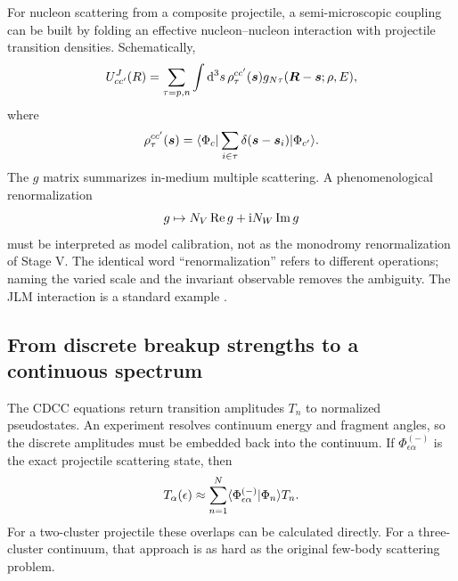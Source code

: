 For nucleon scattering from a composite projectile, a semi-microscopic
coupling can be built by folding an effective nucleon--nucleon interaction
with projectile transition densities.  Schematically,
\begin{equation}
  U^J_{cc'}(R)
  =\sum_{\tau=p,n}
   \int\mathrm{d}^3s\,
   \rho^{cc'}_\tau(\bm s)
   g_{N\tau}(\bm R-\bm s;\rho,E),
  \label{eq:single-folding-coupling}
\end{equation}
where
\begin{equation}
  \rho^{cc'}_\tau(\bm s)
  =\langle \Phi_c \rvert
  \sum_{i\in\tau}\delta(\bm s-\bm s_i)
  \lvert \Phi_{c'} \rangle.
  \label{eq:transition-density}
\end{equation}
The $g$ matrix summarizes in-medium multiple scattering.  A phenomenological
renormalization
\begin{equation}
  g\mapsto N_V\operatorname{Re} g+\mathrm{i} N_W\operatorname{Im} g
  \label{eq:jlm-renormalization}
\end{equation}
must be interpreted as model calibration, not as the monodromy renormalization
of Stage V.  The identical word ``renormalization'' refers to different
operations; naming the varied scale and the invariant observable removes the
ambiguity.  The JLM interaction is a standard example
\cite{Jeukenne1977JLM}.

\subsection{From discrete breakup strengths to a continuous spectrum}
\label{subsec:cdcc-smoothing}

The CDCC equations return transition amplitudes $T_n$ to normalized
pseudostates.  An experiment resolves continuum energy and fragment angles,
so the discrete amplitudes must be embedded back into the continuum.  If
$\Phi_{\epsilon\alpha}^{(-)}$ is the exact projectile scattering state, then
\begin{equation}
  T_\alpha(\epsilon)
  \approx\sum_{n=1}^{N}
  \langle \Phi_{\epsilon\alpha}^{(-)}|\Phi_n \rangle T_n.
  \label{eq:cdcc-exact-smoothing}
\end{equation}
For a two-cluster projectile these overlaps can be calculated directly.  For
a three-cluster continuum, that approach is as hard as the original few-body
scattering problem.

